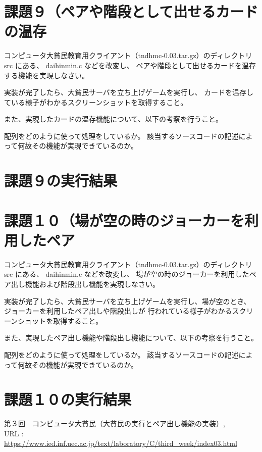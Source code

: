 \documentclass[]{jsarticle}
\begin{document}
\newpage
\section*{課題９（ペアや階段として出せるカードの温存}
コンピュータ大貧民教育用クライアント（tndhmc-0.03.tar.gz）のディレクトリ src にある、 daihinmin.c などを改変し、
ペアや階段として出せるカードを温存する機能を実現しなさい。

実装が完了したら、大貧民サーバを立ち上げゲームを実行し、 カードを温存している様子がわかるスクリーンショットを取得すること。

また、実現したカードの温存機能について、以下の考察を行うこと。

配列をどのように使って処理をしているか。
該当するソースコードの記述によって何故その機能が実現できているのか。

\section*{課題９の実行結果}

\newpage
\section*{課題１０（場が空の時のジョーカーを利用したペア}
コンピュータ大貧民教育用クライアント（tndhmc-0.03.tar.gz）のディレクトリ src にある、 daihinmin.c などを改変し、
場が空の時のジョーカーを利用したペア出し機能および階段出し機能を実現しなさい。

実装が完了したら、大貧民サーバを立ち上げゲームを実行し、場が空のとき、 ジョーカーを利用したペア出しや階段出しが
行われている様子がわかるスクリーンショットを取得すること。

また、実現したペア出し機能や階段出し機能について、以下の考察を行うこと。

配列をどのように使って処理をしているか。
該当するソースコードの記述によって何故その機能が実現できているのか。

\section*{課題１０の実行結果}

\newpage
\begin{thebibliography}{99}
   第３回　コンピュータ大貧民（大貧民の実行とペア出し機能の実装）, \\URL : \url{https://www.ied.inf.uec.ac.jp/text/laboratory/C/third_week/index03.html}
\end{thebibliography}
\end{document}

